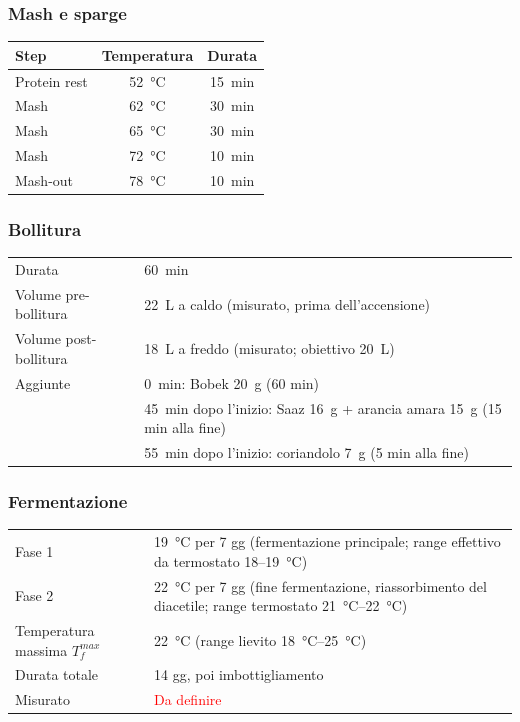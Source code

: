 \subsubsection*{Mash e sparge}
\begin{tabularx}{\linewidth}{@{}Xcc@{}}
\toprule
Step & Temperatura & Durata \\
\midrule
Protein rest & \SI{52}{\celsius} & \SI{15}{\minute} \\
Mash & \SI{62}{\celsius} & \SI{30}{\minute} \\
Mash & \SI{65}{\celsius} & \SI{30}{\minute} \\
Mash & \SI{72}{\celsius} & \SI{10}{\minute} \\
Mash-out & \SI{78}{\celsius} & \SI{10}{\minute} \\
\bottomrule
\end{tabularx}

\subsubsection*{Bollitura}
\begin{tabularx}{\linewidth}{@{}lX@{}}
\toprule
Durata & \SI{60}{\minute} \\
Volume pre-bollitura & \SI{22}{\liter} a caldo (misurato, prima dell'accensione) \\
Volume post-bollitura & \SI{18}{\liter} a freddo (misurato; obiettivo \SI{20}{\liter}) \\
Aggiunte & \SI{0}{\minute}: Bobek \SI{20}{\gram} (60 min) \\
 & \SI{45}{\minute} dopo l'inizio: Saaz \SI{16}{\gram} + arancia amara \SI{15}{\gram} (15 min alla fine) \\
 & \SI{55}{\minute} dopo l'inizio: coriandolo \SI{7}{\gram} (5 min alla fine) \\
\bottomrule
\end{tabularx}

\subsubsection*{Fermentazione}
\begin{tabularx}{\linewidth}{@{}lX@{}}
\toprule
Fase 1 & \SI{19}{\celsius} per 7 gg (fermentazione principale; range effettivo da termostato \SI{18}{}--\SI{19}{\celsius}) \\
Fase 2 & \SI{22}{\celsius} per 7 gg (fine fermentazione, riassorbimento del diacetile; range termostato \SIrange{21}{22}{\celsius}) \\
Temperatura massima $T_f^{max}$ & \SI{22}{\celsius} (range lievito \SIrange{18}{25}{\celsius}) \\
Durata totale & 14 gg, poi imbottigliamento \\
Misurato & \textcolor{red}{Da definire} \\
\bottomrule
\end{tabularx}

